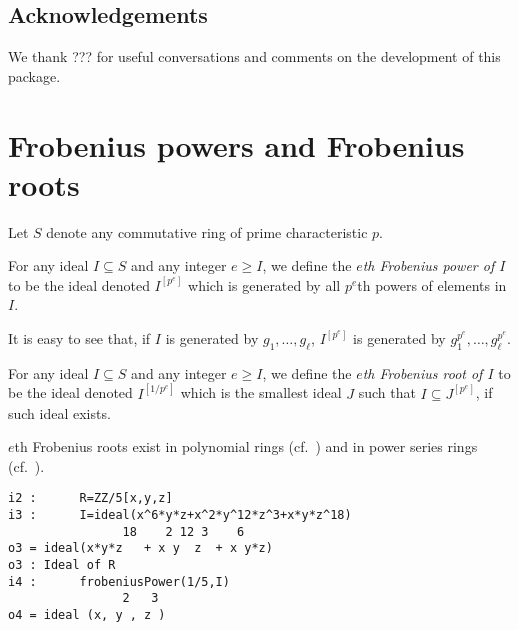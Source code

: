 \documentclass[11pt]{amsart}
\begin{document}
\subsection*{Acknowledgements}

We thank ??? for useful conversations and comments on the development of this package.

\section{Frobenius powers and Frobenius roots}\label{Section: Frobenius powers and Frobenius roots}


Let $S$ denote any commutative ring of prime characteristic $p$.

\begin{definition}
For any ideal $I\subseteq S$ and any integer $e\geq I$, we define the \emph{$e$th Frobenius power of $I$} to be the ideal denoted $I^{[p^e]}$ which is
generated by all $p^e$th powers of elements in $I$.
\end{definition}

It is easy to see that, if $I$ is generated by $g_1, \dots, g_\ell$, $I^{[p^e]}$ is generated by $g_1^{p^e}, \dots, g_\ell^{p^e}$.


\begin{definition}
For any ideal $I\subseteq S$ and any integer $e\geq I$, we define the \emph{$e$th Frobenius root of $I$} to be the ideal denoted $I^{[1/p^{e}]}$ which is
the smallest ideal $J$ such that $I\subseteq J^{[p^e]}$, if such ideal exists.
\end{definition}

$e$th Frobenius roots exist in polynomial rings (cf.~\cite[\S 2]{BlickleMustataSmithDiscretenessAndRationalityOfFThresholds}) and in power series rings
(cf.~\cite[\S 5]{KatzmanParameterTestIdealOfCMRings}).


\begin{verbatim}
i2 :      R=ZZ/5[x,y,z]
i3 :      I=ideal(x^6*y*z+x^2*y^12*z^3+x*y*z^18)
                18    2 12 3    6
o3 = ideal(x*y*z   + x y  z  + x y*z)
o3 : Ideal of R
i4 :      frobeniusPower(1/5,I)
                2   3
o4 = ideal (x, y , z )
\end{verbatim}
\end{document}
